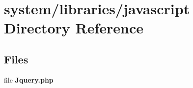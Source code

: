 \section{system/libraries/javascript Directory Reference}
\label{dir_5e5798f8f6d0942b01224c7b9c682be1}
\subsection*{Files}
\begin{DoxyCompactItemize}
\item 
file {\bf Jquery.\-php}
\end{DoxyCompactItemize}
